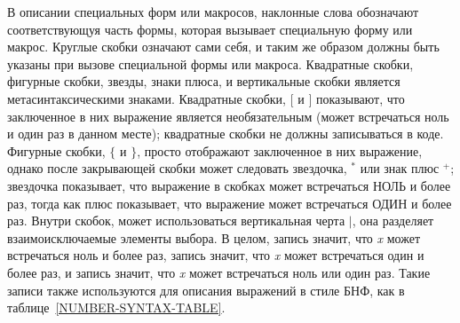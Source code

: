 В описании специальных форм или макросов, наклонные слова обозначают
соответствующуя часть формы, которая вызывает специальную форму или макрос.
Круглые скобки означают сами себя, и таким же образом должны быть указаны при
вызове специальной формы или макроса.
Квадратные скобки, фигурные скобки, звезды, знаки плюса, и вертикальные скобки
является метасинтаксическими знаками.
Квадратные скобки,
$\lbrack$ и $\rbrack$ показывают, что заключенное в них выражение является
необязательным (может встречаться ноль и один раз в данном месте); квадратные
скобки не должны записываться в коде.
Фигурные скобки, $\lbrace$ и $\rbrace$, просто отображают заключенное в них
выражение, однако после закрывающей скобки может следовать звездочка, ${}^*$ или
знак плюс ${}^+$; звездочка показывает, что выражение в скобках может
встречаться НОЛЬ и более раз, тогда как плюс показывает, что выражение может
встречаться ОДИН и более раз. Внутри скобок, может использоваться вертикальная
черта $|$, она разделяет взаимоисключаемые элементы выбора.
В целом, запись  значит, что {\it x} может встречаться ноль и
более раз, запись  значит, что {\it x} может встречаться один и
более раз, и запись  значит, что {\it x} может встречаться ноль или
один раз. Такие записи также используются для описания выражений в стиле БНФ,
как в таблице~\ref{NUMBER-SYNTAX-TABLE}.

